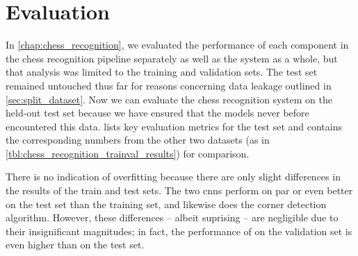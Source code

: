 \documentclass[../main.tex]{subfiles}
\begin{document}
\chapter{Evaluation}
\label{chap:evaluation}
In \cref{chap:chess_recognition}, we evaluated the performance of each component in the chess recognition pipeline separately as well as the system as a whole, but that analysis was limited to the training and validation sets.
The test set remained untouched thus far for reasons concerning data leakage outlined in \cref{sec:split_dataset}.
Now we can evaluate the chess recognition system on the held-out test set because we have ensured that the models never before encountered this data.
 lists key evaluation metrics for the test set and contains the corresponding numbers from the other two datasets (as in \cref{tbl:chess_recognition_trainval_results}) for comparison.
\begin{table}
    \caption[Performance of the chess recognition system on the test dataset.]{Performance of the chess recognition system on the test dataset. The training and validation metrics as per \cref{tbl:chess_recognition_trainval_results} are included for comparison.}
    \label{tbl:chess_recognition_trainvaltest_results}
\end{table}
There is no indication of overfitting because there are only slight differences in the results of the train and test sets.
The two \glspl{cnn} perform on par or even better on the test set than the training set, and likewise does the corner detection algorithm.
However, these differences -- albeit suprising -- are negligible due to their insignificant magnitudes; in fact, the performance of on the validation set is even higher than on the test set.
\end{document}
